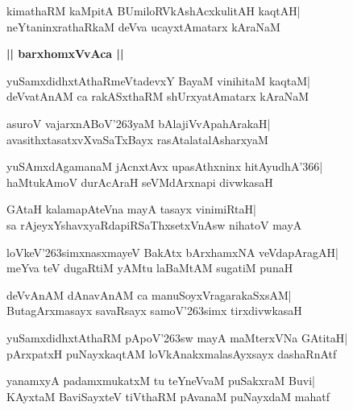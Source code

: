 \documentclass[twoside,12pt,openright]{book}
\def\S{\char'263}
\newcounter{shloka}[chapter]
\def\uvaca#1{\centerline{{\large\textbf{#1}}}}
\begin{document}
\begin{shloka}%
kimathaRM kaMpitA BUmiloRVkAshAcxkulitAH kaqtAH|\\
neYtaninxrathaRkaM deVva ucayxtAmatarx kAraNaM
\end{shloka}

\uvaca{|| barxhomxVvAca ||}
\begin{shloka}%
yuSamxdidhxtAthaRmeVtadevxY BayaM vinihitaM kaqtaM|\\
deVvatAnAM ca rakASxthaRM shUrxyatAmatarx kAraNaM
\end{shloka}

\begin{shloka}%
asuroV vajarxnABoV\S yaM bAlajiVvApahArakaH|\\
avasithxtasatxvXvaSaTxBayx rasAtalatalAsharxyaM
\end{shloka}

\begin{shloka}%
yuSAmxdAgamanaM jAcnxtAvx upasAthxninx hitAyudhA\char'366|\\
haMtukAmoV durAcAraH seVMdArxnapi divwkasaH
\end{shloka}

\begin{shloka}%
GAtaH kalamapAteVna mayA tasayx vinimiRtaH|\\
sa rAjeyxYshavxyaRdapiRSaThxsetxVnAsw nihatoV mayA
\end{shloka}

\begin{shloka}%
loVkeV\S simxnasxmayeV BakAtx bArxhamxNA veVdapAragAH|\\
meYva teV dugaRtiM yAMtu laBaMtAM sugatiM punaH
\end{shloka}

\begin{shloka}%
deVvAnAM dAnavAnAM ca manuSoyxVragarakaSxsAM|\\
ButagArxmasayx savaRsayx samoV\S simx tirxdivwkasaH
\end{shloka}

\begin{shloka}%
yuSamxdidhxtAthaRM pApoV\S sw mayA maMterxVNa GAtitaH|\\
pArxpatxH puNayxkaqtAM loVkAnakxmalasAyxsayx dashaRnAtf
\end{shloka}

\begin{shloka}%
yanamxyA padamxmukatxM tu teYneVvaM puSakxraM Buvi|\\
KAyxtaM BaviSayxteV tiVthaRM pAvanaM puNayxdaM mahatf
\end{shloka}
\end{document}
